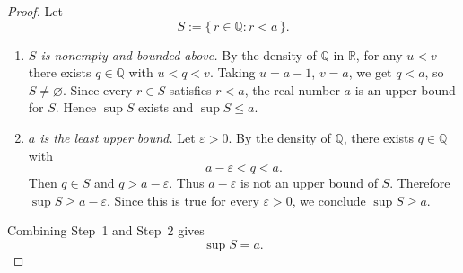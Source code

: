 \documentclass[12pt]{article}
\begin{document}
\begin{proof}
Let 
\[
S := \{\, r \in \mathbb{Q} : r < a \,\}.
\]

\begin{enumerate}[label=\textbf{Step \arabic*.}]
  \item \emph{\(S\) is nonempty and bounded above.}  
  By the density of \(\mathbb{Q}\) in \(\mathbb{R}\), for any \(u<v\) there exists \(q\in\mathbb{Q}\) with \(u<q<v\).  
  Taking \(u=a-1\), \(v=a\), we get \(q<a\), so \(S\neq\varnothing\).  
  Since every \(r\in S\) satisfies \(r<a\), the real number \(a\) is an upper bound for \(S\).  
  Hence \(\sup S\) exists and \(\sup S \le a\).
  
  \item \emph{\(a\) is the least upper bound.}  
  Let \(\varepsilon>0\). By the density of \(\mathbb{Q}\), there exists \(q\in\mathbb{Q}\) with
  \[
  a-\varepsilon < q < a.
  \]
  Then \(q\in S\) and \(q>a-\varepsilon\). Thus \(a-\varepsilon\) is not an upper bound of \(S\).  
  Therefore \(\sup S \ge a-\varepsilon\).  
  Since this is true for every \(\varepsilon>0\), we conclude \(\sup S \ge a\).
\end{enumerate}

Combining Step~1 and Step~2 gives
\[
\sup S = a.
\]
\end{proof}
\end{document}
